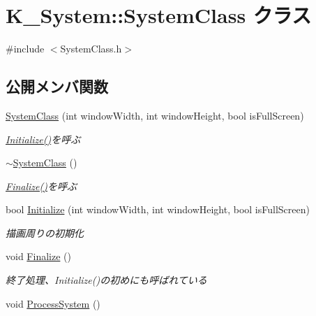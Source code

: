 \hypertarget{class_k___system_1_1_system_class}{}\section{K\+\_\+\+System\+:\+:System\+Class クラス}
\label{class_k___system_1_1_system_class}


{\ttfamily \#include $<$System\+Class.\+h$>$}

\subsection*{公開メンバ関数}
\begin{DoxyCompactItemize}
\item 
\mbox{\hyperlink{class_k___system_1_1_system_class_a0202cc960e52ef4b51f0decb3c3fb35d}{System\+Class}} (int window\+Width, int window\+Height, bool is\+Full\+Screen)
\begin{DoxyCompactList}\small\item\em \mbox{\hyperlink{class_k___system_1_1_system_class_a2db013b3b45f150df5355fd5265c8705}{Initialize()}}を呼ぶ \end{DoxyCompactList}\item 
\mbox{\hyperlink{class_k___system_1_1_system_class_a5bdd9b6b328727510a660dc7ab9ea8ac}{$\sim$\+System\+Class}} ()
\begin{DoxyCompactList}\small\item\em \mbox{\hyperlink{class_k___system_1_1_system_class_a93d05d4f421da35f53c4969e53ca7d49}{Finalize()}}を呼ぶ \end{DoxyCompactList}\item 
bool \mbox{\hyperlink{class_k___system_1_1_system_class_a2db013b3b45f150df5355fd5265c8705}{Initialize}} (int window\+Width, int window\+Height, bool is\+Full\+Screen)
\begin{DoxyCompactList}\small\item\em 描画周りの初期化 \end{DoxyCompactList}\item 
void \mbox{\hyperlink{class_k___system_1_1_system_class_a93d05d4f421da35f53c4969e53ca7d49}{Finalize}} ()
\begin{DoxyCompactList}\small\item\em 終了処理、\+Initialize()の初めにも呼ばれている \end{DoxyCompactList}\item 
void \mbox{\hyperlink{class_k___system_1_1_system_class_a242be8d90313c17762b0013c30cafa47}{Process\+System}} ()

\end{DoxyCompactItemize}
